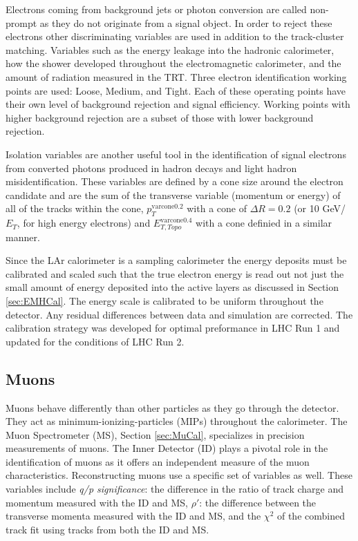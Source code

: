 Electrons coming from background jets or photon conversion are called non-prompt as they do not originate from a signal object.  In order to reject these electrons other discriminating variables are used in addition to the track-cluster matching.  Variables such as the energy leakage into the hadronic calorimeter, how the shower developed throughout the electromagnetic calorimeter, and the amount of radiation measured in the TRT.  Three electron identification working points are used: Loose, Medium, and Tight.  Each of these operating points have their own level of background rejection and signal efficiency.  Working points with higher background rejection are a subset of those with lower background rejection.

Isolation variables are another useful tool in the identification of signal electrons from converted photons produced in hadron decays and light hadron misidentification.  These variables are defined by a cone size around the electron candidate and are the sum of the transverse variable (momentum or energy) of all of the tracks within the cone, $p_{T}^{\text{varcone0.2}}$ with a cone of $\Delta R =0.2$ (or 10 GeV/$E_T$, for high energy electrons) and $E_{T, Topo}^{\text{varcone0.4}}$ with a cone definied in a similar manner.  

Since the LAr calorimeter is a sampling calorimeter the energy deposits must be calibrated and scaled such that the true electron energy is read out not just the small amount of energy deposited into the active layers as discussed in Section \ref{sec:EMHCal}.  The energy scale is calibrated to be uniform throughout the detector.  Any residual differences between data and simulation are corrected.  The calibration strategy was developed for optimal preformance in LHC Run 1\cite{ElectronCalib1} and updated for the conditions of LHC Run 2\cite{ElectronCalib2}.

\subsection{Muons}
Muons behave differently than other particles as they go through the detector.  They act as minimum-ionizing-particles (MIPs) throughout the calorimeter.  The Muon Spectrometer (MS), Section \ref{sec:MuCal}, specializes in precision measurements of muons.  The Inner Detector (ID) plays a pivotal role in the identification of muons as it offers an independent measure of the muon characteristics.  Reconstructing muons use a specific set of variables as well\cite{MuonID}.  These variables include \textit{ q/p significance}: the difference in the ratio of track charge and momentum measured with the ID and MS, $\rho'$: the difference between the transverse momenta measured with the ID and MS, and the $\chi^2$ of the combined track fit using tracks from both the ID and MS.


